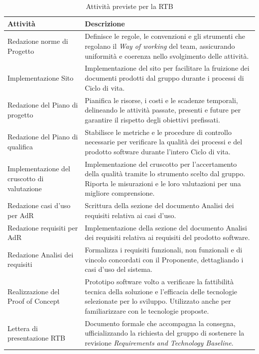 \documentclass[a4paper,12pt]{article}
\begin{document}
\begin{table}[H]
    \centering
    \renewcommand{\arraystretch}{1.5}
    \begin{tabularx}{\textwidth}{|L|Z|}
        \hline
        \textbf{Attività} & \textbf{Descrizione} \\
        \hline
        Redazione norme di Progetto & Definisce le regole, le convenzioni e gli strumenti che regolano il \textit{Way of working} del team, assicurando uniformità e coerenza nello svolgimento delle attività. \\
        \hline
        Implementazione Sito & Implementazione del sito per facilitare la fruizione dei documenti prodotti dal gruppo durante i processi di Ciclo di vita. \\
        \hline
        Redazione del Piano di progetto & Pianifica le risorse, i costi e le scadenze temporali, delineando le attività passate, presenti e future per garantire il rispetto degli obiettivi prefissati. \\
        \hline
        Redazione del Piano di qualifica & Stabilisce le metriche e le procedure di controllo necessarie per verificare la qualità dei processi e del prodotto software durante l'intero Ciclo di vita. \\
        \hline
        Implementazione del cruscotto di valutazione & Implementazione del cruscotto per l'accertamento della qualità tramite lo strumento scelto dal gruppo. Riporta le misurazioni e le loro valutazioni per una migliore comprensione. \\
        \hline
        Redazione casi d'uso per AdR & Scrittura della sezione del documento Analisi dei requisiti relativa ai casi d'uso. \\
        \hline
        Redazione requisiti per AdR & Implementazione della sezione del documento Analisi dei requisiti relativa ai requisiti del prodotto software. \\
        \hline
        Redazione Analisi dei requisiti & Formalizza i requisiti funzionali, non funzionali e di vincolo concordati con il Proponente, dettagliando i casi d'uso del sistema. \\
        \hline
        Realizzazione del Proof of Concept & Prototipo software volto a verificare la fattibilità tecnica della soluzione e l'efficacia delle tecnologie selezionate per lo sviluppo. Utilizzato anche per familiarizzare con le tecnologie proposte. \\
        \hline
        Lettera di presentazione RTB & Documento formale che accompagna la consegna, ufficializzando la richiesta del gruppo di sostenere la revisione \textit{Requirements and Technology Baseline}. \\
        \hline
    \end{tabularx}
    \caption{Attività previste per la RTB}
    \label{tab:attivita_rtb}
\end{table}
\end{document}
